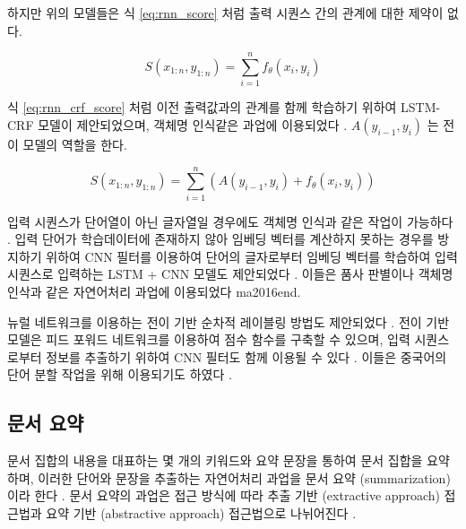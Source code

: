 \documentclass[11pt]{article}
\begin{document}
하지만 위의 모델들은 식 \ref{eq:rnn_score} 처럼 출력 시퀀스 간의 관계에 대한 제약이 없다.

\begin{equation}
  \label{eq:rnn_score}
  S(x_{1:n}, y_{1:n}) = \sum_{i=1}^n f_\theta(x_i, y_i)
\end{equation}

식 \ref{eq:rnn_crf_score} 처럼 이전 출력값과의 관계를 함께 학습하기 위하여 LSTM-CRF 모델이 제안되었으며, 객체명 인식같은 과업에 이용되었다 \citep{lample2016neural}.
$A(y_{i-1}, y_i)$ 는 전이 모델의 역할을 한다.

\begin{equation}
  \label{eq:rnn_crf_score}
  S(x_{1:n}, y_{1:n}) = \sum_{i=1}^n \left( A(y_{i-1}, y_i) + f_\theta(x_i, y_i) \right)
\end{equation}

입력 시퀀스가 단어열이 아닌 글자열일 경우에도 객체명 인식과 같은 작업이 가능하다 \citep{gridach2017character}.
입력 단어가 학습데이터에 존재하지 않아 임베딩 벡터를 계산하지 못하는 경우를 방지하기 위하여 CNN 필터를 이용하여 단어의 글자로부터 임베딩 벡터를 학습하여 입력 시퀀스로 입력하는 LSTM + CNN 모델도 제안되었다 \citep{chiu2016named}.
이들은 품사 판별이나 객체명 인삭과 같은 자연어처리 과업에 이용되었다 {ma2016end}.

뉴럴 네트워크를 이용하는 전이 기반 순차적 레이블링 방법도 제안되었다 \citep{zheng2013deep, collobert2011natural, alberti2015improved}.
전이 기반 모델은 피드 포워드 네트워크를 이용하여 점수 함수를 구축할 수 있으며, 입력 시퀀스로부터 정보를 추출하기 위하여 CNN 필터도 함께 이용될 수 있다 \citep{collobert2011natural}.
이들은 중국어의 단어 분할 작업을 위해 이용되기도 하였다 \citep{zhang2016transition, cai2017fast, ballesteros2015improved}.


\subsection{문서 요약}

문서 집합의 내용을 대표하는 몇 개의 키워드와 요약 문장을 통하여 문서 집합을 요약하며, 이러한 단어와 문장을 추출하는 자연어처리 과업을 문서 요약 (summarization) 이라 한다 \citep{yao2017recent}.
문서 요약의 과업은 접근 방식에 따라 추출 기반 (extractive approach) 접근법과 요약 기반 (abstractive approach) 접근법으로 나뉘어진다 \citep{yao2017recent}.
\end{document}

